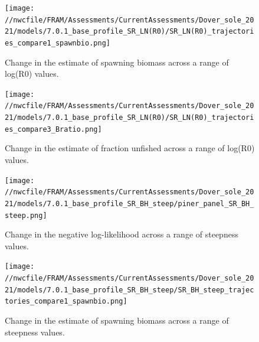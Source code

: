 \documentclass[11pt,
  english,
  a4paper,
]{article}
\begin{document}
\tagmcend\tagstructend


\begin{figure}
\centering
\texttt{[image: //nwcfile/FRAM/Assessments/CurrentAssessments/Dover\_sole\_2021/models/7.0.1\_base\_profile\_SR\_LN(R0)/SR\_LN(R0)\_trajectories\_compare1\_spawnbio.png]}
\caption{Change in the estimate of spawning biomass across a range of log(R0) values.\label{fig:r0-ssb}}
\end{figure}

\tagmcend\tagstructend


\begin{figure}
\centering
\texttt{[image: //nwcfile/FRAM/Assessments/CurrentAssessments/Dover\_sole\_2021/models/7.0.1\_base\_profile\_SR\_LN(R0)/SR\_LN(R0)\_trajectories\_compare3\_Bratio.png]}
\caption{Change in the estimate of fraction unfished across a range of log(R0) values.\label{fig:r0-depl}}
\end{figure}

\tagmcend\tagstructend


\begin{figure}
\centering
\texttt{[image: //nwcfile/FRAM/Assessments/CurrentAssessments/Dover\_sole\_2021/models/7.0.1\_base\_profile\_SR\_BH\_steep/piner\_panel\_SR\_BH\_steep.png]}
\caption{Change in the negative log-likelihood across a range of steepness values.\label{fig:h-profile}}
\end{figure}

\tagmcend\tagstructend


\begin{figure}
\centering
\texttt{[image: //nwcfile/FRAM/Assessments/CurrentAssessments/Dover\_sole\_2021/models/7.0.1\_base\_profile\_SR\_BH\_steep/SR\_BH\_steep\_trajectories\_compare1\_spawnbio.png]}
\caption{Change in the estimate of spawning biomass across a range of steepness values.\label{fig:h-ssb}}
\end{figure}
\end{document}
